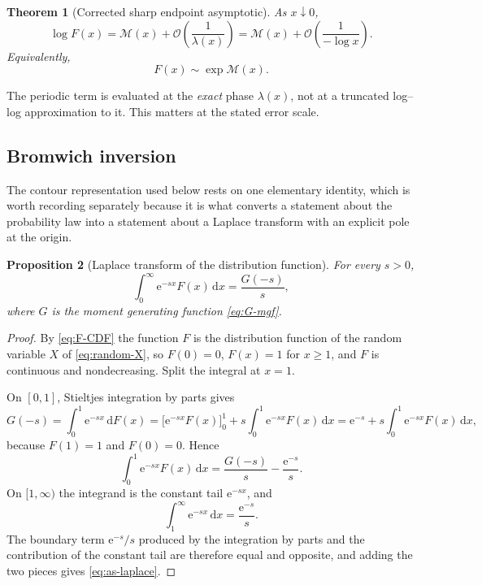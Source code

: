 \documentclass[11pt,oneside]{article}
\newtheorem{theorem}{Theorem}[section]
\newtheorem{proposition}[theorem]{Proposition}
\theoremstyle{definition}
\theoremstyle{remark}
\newcommand{\e}{\mathrm e}
\newcommand{\dd}{\,\mathrm d}
\newcommand{\bigO}{\mathcal O}
\begin{document}
\begin{theorem}[Corrected sharp endpoint asymptotic]
As $x\downarrow0$,
\begin{equation}
 \boxed{
 \log F(x)=\mathcal M(x)+\bigO\!\left(\frac1{\lambda(x)}\right)
 =\mathcal M(x)+\bigO\!\left(\frac1{-\log x}\right).}     \label{eq:sharp-log-asymptotic}
\end{equation}
Equivalently,
\begin{equation}
 F(x)\sim\exp\mathcal M(x).                               \label{eq:sharp-equivalent}
\end{equation}
\end{theorem}

The periodic term is evaluated at the \emph{exact} phase $\lambda(x)$, not at a truncated
log--log approximation to it.  This matters at the stated error scale.

\subsection{Bromwich inversion}


The contour representation used below rests on one elementary identity, which is worth
recording separately because it is what converts a statement about the probability law into
a statement about a Laplace transform with an explicit pole at the origin.

\begin{proposition}[Laplace transform of the distribution function]
\label{prop:as-laplace}
For every $s>0$,
\begin{equation}
 \int_0^{\infty}\e^{-sx}F(x)\dd x=\frac{G(-s)}{s},        \label{eq:as-laplace}
\end{equation}
where $G$ is the moment generating function \eqref{eq:G-mgf}.
\end{proposition}

\begin{proof}
By \eqref{eq:F-CDF} the function $F$ is the distribution function of the random variable $X$
of \eqref{eq:random-X}, so $F(0)=0$, $F(x)=1$ for $x\ge1$, and $F$ is continuous and
nondecreasing.  Split the integral at $x=1$.

On $[0,1]$, Stieltjes integration by parts gives
\begin{equation}
 G(-s)=\int_0^1\e^{-sx}\dd F(x)
 =\bigl[\e^{-sx}F(x)\bigr]_{0}^{1}+s\int_0^1\e^{-sx}F(x)\dd x
 =\e^{-s}+s\int_0^1\e^{-sx}F(x)\dd x,                     \label{eq:as-laplace-parts}
\end{equation}
because $F(1)=1$ and $F(0)=0$.  Hence
\begin{equation*}
 \int_0^1\e^{-sx}F(x)\dd x=\frac{G(-s)}{s}-\frac{\e^{-s}}{s}.
\end{equation*}
On $[1,\infty)$ the integrand is the constant tail $\e^{-sx}$, and
\begin{equation*}
 \int_1^{\infty}\e^{-sx}\dd x=\frac{\e^{-s}}{s}.
\end{equation*}
The boundary term $\e^{-s}/s$ produced by the integration by parts and the contribution of
the constant tail are therefore equal and opposite, and adding the two pieces gives
\eqref{eq:as-laplace}.
\end{proof}
\end{document}
